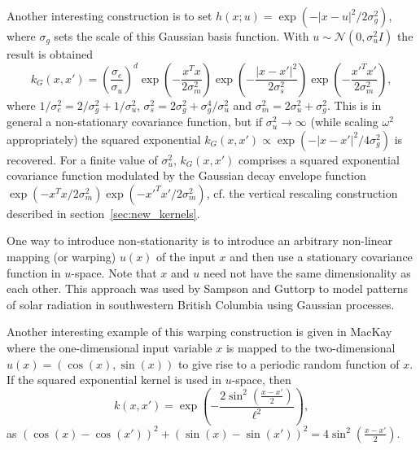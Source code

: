 \documentclass[11pt]{book}
\begin{document}
Another interesting construction is to set $h(x; u) = \exp(-|x - u|^2/2\sigma_g^2)$, where $\sigma_g$ sets the scale of this Gaussian basis function. With $u \sim \mathcal{N}(0, \sigma_u^2 I)$ the result is obtained
\begin{equation}
\label{eq:modulated_se}
k_G(x, x') = \left(\frac{\sigma_e}{\sigma_u}\right)^d \exp\left(-\frac{x^T x}{2\sigma_m^2}\right) \exp\left(-\frac{|x - x'|^2}{2\sigma_s^2}\right) \exp\left(-\frac{x'^T x'}{2\sigma_m^2}\right),
\end{equation}
where $1/\sigma_e^2 = 2/\sigma_g^2 + 1/\sigma_u^2$, $\sigma_s^2 = 2\sigma_g^2 + \sigma_g^4/\sigma_u^2$ and $\sigma_m^2 = 2\sigma_u^2 + \sigma_g^2$. This is in general a non-stationary covariance function, but if $\sigma_u^2 \to \infty$ (while scaling $\omega^2$ appropriately) the squared exponential $k_G(x, x') \propto \exp(-|x - x'|^2/4\sigma_g^2)$ is recovered. For a finite value of $\sigma_u^2$, $k_G(x, x')$ comprises a squared exponential covariance function modulated by the Gaussian decay envelope function $\exp(-x^T x/2\sigma_m^2) \exp(-x'^T x'/2\sigma_m^2)$, cf. the vertical rescaling construction described in section~\ref{sec:new_kernels}.

One way to introduce non-stationarity is to introduce an arbitrary non-linear mapping (or warping) $u(x)$ of the input $x$ and then use a stationary covariance function in $u$-space. Note that $x$ and $u$ need not have the same dimensionality as each other. This approach was used by Sampson and Guttorp \cite{sampson1992} to model patterns of solar radiation in southwestern British Columbia using Gaussian processes.

Another interesting example of this warping construction is given in MacKay \cite{mackay1998} where the one-dimensional input variable $x$ is mapped to the two-dimensional $u(x) = (\cos(x), \sin(x))$ to give rise to a periodic random function of $x$. If the squared exponential kernel is used in $u$-space, then
\begin{equation}
\label{eq:periodic_kernel}
k(x, x') = \exp\left(-\frac{2\sin^2\left(\frac{x-x'}{2}\right)}{\ell^2}\right),
\end{equation}
as $(\cos(x) - \cos(x'))^2 + (\sin(x) - \sin(x'))^2 = 4\sin^2\left(\frac{x-x'}{2}\right)$.
\end{document}

